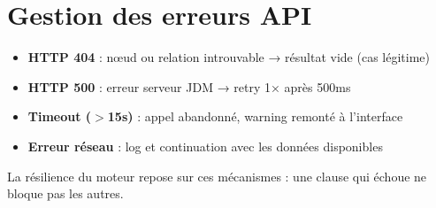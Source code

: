 \section{Gestion des erreurs API}

\begin{itemize}
    \item \textbf{HTTP 404} : nœud ou relation introuvable → résultat vide (cas légitime)
    \item \textbf{HTTP 500} : erreur serveur JDM → retry 1× après 500ms
    \item \textbf{Timeout ($>$15s)} : appel abandonné, warning remonté à l'interface
    \item \textbf{Erreur réseau} : log et continuation avec les données disponibles
\end{itemize}

La résilience du moteur repose sur ces mécanismes : une clause qui échoue ne bloque pas les autres.
